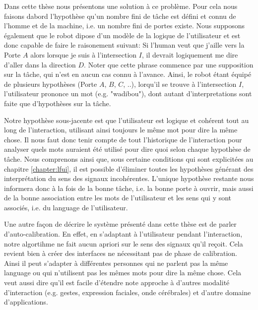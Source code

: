 Dans cette thèse nous présentons une solution à ce problème. Pour cela nous faisons dabord l'hypothèse qu'un nombre fini de tâche est défini et connu de l'homme et de la machine, i.e. un nombre fini de portes existe. Nous supposons également que le robot dipose d'un modèle de la logique de l'utilisateur et est donc capable de faire le raisonement suivant: Si l'human veut que j'aille vers la Porte $A$ alors lorsque je suis à l'intersection $I$, il devrait logiquement me dire d'aller dans la direction $D$. Noter que cette phrase commence par une supposition sur la tâche, qui n'est en aucun cas connu à l'avance. Ainsi, le robot étant équipé de plusieurs hypothèses (Porte $A$, $B$, $C$, ..), lorqu'il se trouve à l'intersection $I$, l'utilisateur prononce un mot (e.g. "wadibou"), dont autant d'interpretations sont faite que d'hypothèses sur la tâche.

Notre hypothèse sous-jacente est que l'utilisateur est logique et cohérent tout au long de l'interaction, utilisant ainsi toujours le même mot pour dire la même chose. Il nous faut donc tenir compte de tout l'historique de l'interaction pour analyser quels mots auraient été utilisé pour dire quoi selon chaque hypothèse de tâche. Nous comprenons ainsi que, sous certaine conditions qui sont explicitées au chapitre \ref{chapter:lfui}, il est possible d'éliminer toutes les hypothèses générant des interprétation du sens des signaux incohérentes. L'unique hypothèse restante nous informera donc à la fois de la bonne tâche, i.e. la bonne porte à ouvrir, mais aussi de la bonne association entre les mots de l'utilisateur et les sens qui y sont associés, i.e. du language de l'utilisateur.

Une autre façon de décrire le système présenté dans cette thèse est de parler d'auto-calibration. En effet, en s'adaptant à l'utilisateur pendant l'interaction, notre algortihme ne fait aucun apriori sur le sens des signaux qu'il reçoit. Cela revient bien à créer des interfaces ne nécessitant pas de phase de calibration. Ainsi il peut s'adapter à différentes personnes qui ne parlent pas la même language ou qui n'utilisent pas les mêmes mots pour dire la même chose. Cela veut aussi dire qu'il est facile d'étendre note approche à d'autres modalité d'interaction (e.g. gestes, expression faciales, onde cérébrales) et d'autre domaine d'applications.


